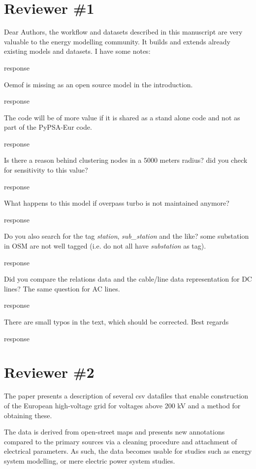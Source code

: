 \documentclass{response}
\begin{document}
\newpage
\section*{Reviewer \#1}

\RC Dear Authors, the workflow and datasets described in this manuscript are very valuable to the energy modelling community. It builds and extends already existing models and datasets. I have some notes: 

\AR response

\RC Oemof is missing as an open source model in the introduction.

\AR response

\RC The code will be of more value if it is shared as a stand alone code and not as part of the PyPSA-Eur code. 

\AR response

\RC Is there a reason behind clustering nodes in a 5000 meters radius? did you check for sensitivity to this value? 

\AR response

\RC What happens to this model if overpass turbo is not maintained anymore? 

\AR response

\RC Do you also search for the tag \textit{station}, \textit{sub\_station} and the like? some substation in OSM are not well tagged (i.e. do not all have \textit{substation} as tag). 

\AR response

\RC Did you compare the relations data and the cable/line data representation for DC lines? The same question for AC lines.

\AR response

\RC There are small typos in the text, which should be corrected. Best regards

\AR response

\newpage
\section*{Reviewer \#2}

\RC The paper presents a description of several csv datafiles that enable construction of the European high-voltage grid for voltages above 200 kV and a method for obtaining these.

\RC The data is derived from open-street maps and presents new annotations compared to the primary sources via a cleaning procedure and attachment of electrical parameters. As such, the data becomes usable for studies such as energy system modelling, or mere electric power system studies.
\end{document}
